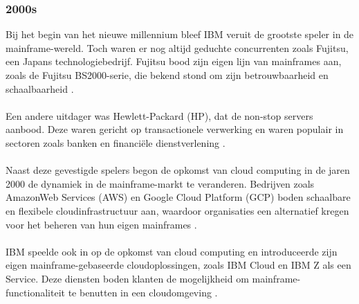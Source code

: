 \subsubsection{2000s}
Bij het begin van het nieuwe millennium bleef IBM veruit de grootste speler in de mainframe-wereld. Toch waren er nog altijd geduchte concurrenten zoals Fujitsu, een Japans technologiebedrijf. Fujitsu bood zijn eigen lijn van mainframes aan, zoals de Fujitsu BS2000-serie, die bekend stond om zijn betrouwbaarheid en schaalbaarheid \autocite{LaMonica2004}.
\\ \\
Een andere uitdager was Hewlett-Packard (HP), dat de non-stop servers aanbood. Deze waren gericht op transactionele verwerking en waren populair in sectoren zoals banken en financiële dienstverlening \autocite{LaMonica2004}.
\\ \\
Naast deze gevestigde spelers begon de opkomst van cloud computing in de jaren 2000 de dynamiek in de mainframe-markt te veranderen. Bedrijven zoals AmazonWeb Services (AWS) en Google Cloud Platform (GCP) boden schaalbare en flexibele cloudinfrastructuur aan, waardoor organisaties een alternatief kregen voor het beheren van hun eigen mainframes \autocite{AWS} \autocite{Google}.
\\ \\
IBM speelde ook in op de opkomst van cloud computing en introduceerde zijn eigen mainframe-gebaseerde cloudoplossingen, zoals IBM Cloud en IBM Z als een Service. Deze diensten boden klanten de mogelijkheid om mainframe-functionaliteit te benutten in een cloudomgeving \autocite{IBM}.
\\ \\
